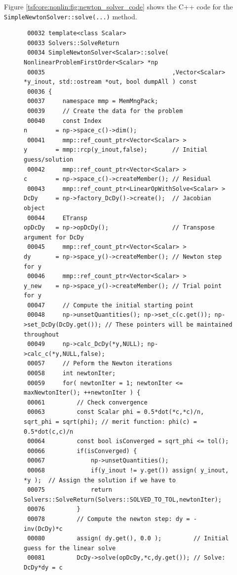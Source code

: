 Figure \ref{tsfcore:nonlin:fig:newton_solver_code} shows the C++ code for the
\texttt{Simple\-Newton\-Solver\-::solve(...)} method.
%
{\bsinglespace
\begin{figure}
\begin{minipage}{\textwidth}
{\tiny\begin{verbatim}
 00032 template<class Scalar>
 00033 Solvers::SolveReturn
 00034 SimpleNewtonSolver<Scalar>::solve( NonlinearProblemFirstOrder<Scalar> *np
 00035                                    ,Vector<Scalar> *y_inout, std::ostream *out, bool dumpAll ) const
 00036 {
 00037     namespace mmp = MemMngPack;
 00039     // Create the data for the problem
 00040     const Index                                     n        = np->space_c()->dim();
 00041     mmp::ref_count_ptr<Vector<Scalar> >             y        = mmp::rcp(y_inout,false);       // Initial guess/solution
 00042     mmp::ref_count_ptr<Vector<Scalar> >             c        = np->space_c()->createMember(); // Residual
 00043     mmp::ref_count_ptr<LinearOpWithSolve<Scalar> >  DcDy     = np->factory_DcDy()->create();  // Jacobian object
 00044     ETransp                                         opDcDy   = np->opDcDy();                  // Transpose argument for DcDy
 00045     mmp::ref_count_ptr<Vector<Scalar> >             dy       = np->space_y()->createMember(); // Newton step for y
 00046     mmp::ref_count_ptr<Vector<Scalar> >             y_new    = np->space_y()->createMember(); // Trial point for y
 00047     // Compute the initial starting point
 00048     np->unsetQuantities(); np->set_c(c.get()); np->set_DcDy(DcDy.get()); // These pointers will be maintained throughout
 00049     np->calc_DcDy(*y,NULL); np->calc_c(*y,NULL,false);
 00057     // Peform the Newton iterations
 00058     int newtonIter;
 00059     for( newtonIter = 1; newtonIter <= maxNewtonIter(); ++newtonIter ) {
 00061         // Check convergence
 00063         const Scalar phi = 0.5*dot(*c,*c)/n, sqrt_phi = sqrt(phi); // merit function: phi(c) = 0.5*dot(c,c)/n
 00064         const bool isConverged = sqrt_phi <= tol();
 00066         if(isConverged) {
 00067             np->unsetQuantities();
 00068             if(y_inout != y.get()) assign( y_inout, *y );  // Assign the solution if we have to
 00075             return Solvers::SolveReturn(Solvers::SOLVED_TO_TOL,newtonIter);
 00076         }
 00078         // Compute the newton step: dy = -inv(DcDy)*c
 00080         assign( dy.get(), 0.0 );         // Initial guess for the linear solve
 00081         DcDy->solve(opDcDy,*c,dy.get()); // Solve: DcDy*dy = c

\end{verbatim}}
\end{minipage}
\end{figure}}
